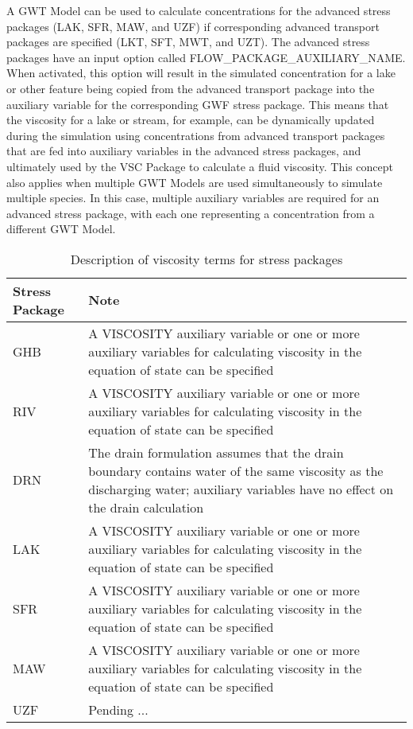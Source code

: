 A GWT Model can be used to calculate concentrations for the advanced stress packages (LAK, SFR, MAW, and UZF) if corresponding advanced transport packages are specified (LKT, SFT, MWT, and UZT).  The advanced stress packages have an input option called FLOW\_PACKAGE\_AUXILIARY\_NAME.  When activated, this option will result in the simulated concentration for a lake or other feature being copied from the advanced transport package into the auxiliary variable for the corresponding GWF stress package.  This means that the viscosity for a lake or stream, for example, can be dynamically updated during the simulation using concentrations from advanced transport packages that are fed into auxiliary variables in the advanced stress packages, and ultimately used by the VSC Package to calculate a fluid viscosity.  This concept also applies when multiple GWT Models are used simultaneously to simulate multiple species.  In this case, multiple auxiliary variables are required for an advanced stress package, with each one representing a concentration from a different GWT Model.  


\begin{longtable}{p{3cm} p{12cm}}
\caption{Description of viscosity terms for stress packages}
\tabularnewline
\hline
\hline
\textbf{Stress Package} & \textbf{Note} \\
\hline
\endhead
\hline
\endfoot
GHB & A VISCOSITY auxiliary variable or one or more auxiliary variables for calculating viscosity in the equation of state can be specified \\
RIV & A VISCOSITY auxiliary variable or one or more auxiliary variables for calculating viscosity in the equation of state can be specified \\
DRN & The drain formulation assumes that the drain boundary contains water of the same viscosity as the discharging water; auxiliary variables have no effect on the drain calculation  \\
LAK & A VISCOSITY auxiliary variable or one or more auxiliary variables for calculating viscosity in the equation of state can be specified \\
SFR & A VISCOSITY auxiliary variable or one or more auxiliary variables for calculating viscosity in the equation of state can be specified \\
MAW & A VISCOSITY auxiliary variable or one or more auxiliary variables for calculating viscosity in the equation of state can be specified \\
UZF & Pending ... \\
\end{longtable}

